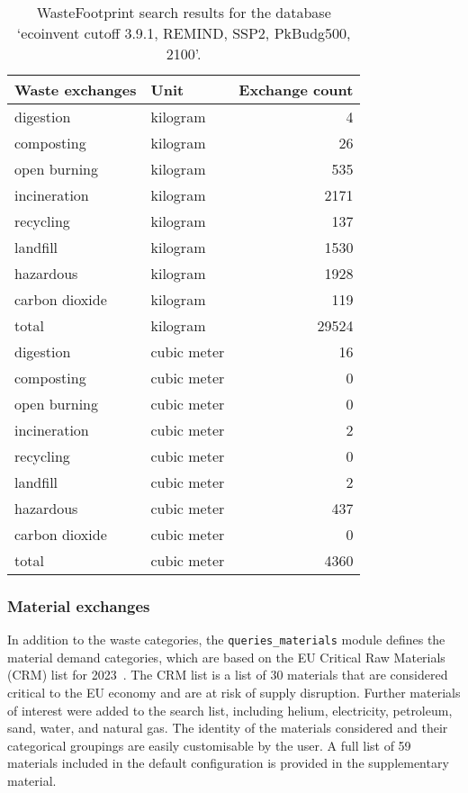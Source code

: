 \begin{table}[ht]
    \centering
    \caption{WasteFootprint search results for the database `ecoinvent cutoff 3.9.1, REMIND, SSP2, PkBudg500, 2100'.}\label{tab:wf_results}
    \begin{tabular}{llr}
        \toprule
        \textbf{Waste exchanges} & \textbf{Unit} & \textbf{Exchange count} \\
        \midrule
        digestion & kilogram & 4 \\
        composting & kilogram & 26 \\
        open burning & kilogram & 535 \\
        incineration & kilogram & 2171 \\
        recycling & kilogram & 137 \\
        landfill & kilogram & 1530 \\
        hazardous & kilogram & 1928 \\
        carbon dioxide & kilogram & 119 \\
        total & kilogram & 29524 \\
        digestion & cubic meter & 16 \\
        composting & cubic meter & 0 \\
        open burning & cubic meter & 0 \\
        incineration & cubic meter & 2 \\
        recycling & cubic meter & 0 \\
        landfill & cubic meter & 2 \\
        hazardous & cubic meter & 437 \\
        carbon dioxide & cubic meter & 0 \\
        total & cubic meter & 4360 \\
        \bottomrule
\end{tabular}
\end{table}

\subsubsection{Material exchanges}\label{sec:method-T-reX-material_exchanges}
In addition to the waste categories, the \texttt{queries\_materials} module defines the material demand categories, which are based on the EU Critical Raw Materials (CRM) list for 2023~\citep{eu2023crmstudy}. The CRM list is a list of 30 materials that are considered critical to the EU economy and are at risk of supply disruption. Further materials of interest were added to the search list, including helium, electricity, petroleum, sand, water, and natural gas. The identity of the materials considered and their categorical groupings are easily customisable by the user. A full list of 59 materials included in the default configuration is provided in the supplementary material.

